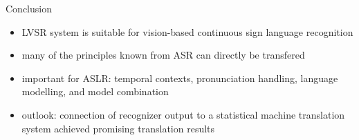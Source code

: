 \documentclass[final,t]{beamer}
\begin{document}
\begin{frame}{}
\begin{columns}[t]
\begin{column}{.3\linewidth}
      \begin{block}{Conclusion}
        \begin{itemize}
        \item LVSR system is suitable for vision-based continuous sign language recognition
        \item many of the principles known from ASR can directly be transfered 
        \item important for ASLR: temporal contexts, pronunciation handling, language modelling, and model combination
        \item \alert{outlook:} connection of recognizer output to a
          statistical machine translation system achieved promising
          translation results
        \end{itemize}
        \vspace{-1ex}
      \end{block}

    \end{column}
  \end{columns}
\end{frame}
\end{document}
